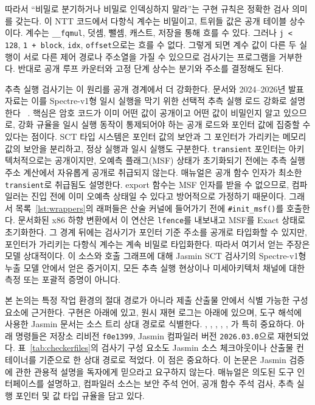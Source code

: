 \documentclass[10pt,twocolumn]{article}
\newcommand{\jasmin}{Jasmin}
\begin{document}
따라서 ``비밀로 분기하거나 비밀로 인덱싱하지 말라''는 구현 규칙은
정확한 검사 의미를 갖는다. 이 NTT 코드에서 다항식 계수는 비밀이고,
트위들 값은 공개 테이블 상수이다. 계수는 \texttt{\_\_fqmul}, 덧셈,
뺄셈, 캐스트, 저장을 통해 흐를 수 있다. 그러나 \texttt{j < 128},
\texttt{1 + block}, \texttt{idx}, \texttt{offset}으로는 흐를 수 없다.
그렇게 되면 계수 값이 다른 두 실행이 서로 다른 제어 경로나 주소열을
가질 수 있으므로 검사기는 프로그램을 거부한다. 반대로 공개 루프
카운터와 고정 단계 상수는 분기와 주소를 결정해도 된다.

추측 실행 검사기는 이 원리를 공개 경계에서 더 강화한다. 문서와
2024--2026년 발표 자료는 이를 Spectre-v1형 일시 실행을 막기 위한
선택적 추측 실행 로드 강화로 설명한다
~\cite{JasminCourse2024,JasminFramework2026}. 핵심은 암호 코드가 이미 어떤 값이 공개이고 어떤 값이 비밀인지
알고 있으므로, 강화 규율을 일시 실행 동작이 통제되어야 하는 공개
로드와 포인터 값에 집중할 수 있다는 점이다. SCT
타입 시스템은 포인터 값의 보안과 그 포인터가 가리키는 메모리 값의
보안을 분리하고, 정상 실행과 일시 실행도 구분한다. \texttt{transient}
포인터는 아키텍처적으로는 공개이지만, 오예측 플래그(MSF) 상태가
초기화되기 전에는 추측 실행 주소 계산에서 자유롭게 공개로 취급되지
않는다. 매뉴얼은 공개 함수 인자가 최소한 \texttt{transient}로 취급됨도
설명한다. export 함수는 MSF 인자를 받을 수 없으므로, 컴파일러는
진입 전에 이미 오예측 상태일 수 있다고 방어적으로 가정하기
때문이다. 그래서 목록~\ref{lst:wrappers}의 래퍼들은 산술 커널에
들어가기 전에 \texttt{\#init\_msf()}를 호출한다. 문서화된 x86 하향
변환에서 이 연산은 \texttt{lfence}를 내보내고 MSF를 Exact 상태로
초기화한다. 그 경계 뒤에는 검사기가 포인터 기준 주소를 공개로
타입화할 수 있지만, 포인터가 가리키는 다항식 계수는 계속 비밀로
타입화한다. 따라서 여기서 얻는 주장은 모델 상대적이다. 이 소스와 호출
그래프에 대해 \jasmin{} SCT 검사기의 Spectre-v1형 누출 모델 안에서
얻은 증거이지, 모든 추측 실행 현상이나 미세아키텍처 채널에 대한 측정
또는 포괄적 증명이 아니다.

본 논의는 특정 작업 환경의 절대 경로가 아니라 제출 산출물 안에서 식별
가능한 구성 요소에 근거한다. 구현은  아래에 있고, 원시
재현 로그는  아래에 있으며, 도구 해석에 사용한
\jasmin{} 문서는 소스 트리 상대 경로로 식별한다.
, ,
, ,
,
가 특히 중요하다. 아래 명령들은
저장소 리비전 \texttt{f0e1399}, \jasmin{} 컴파일러 버전
\texttt{2026.03.0}으로 재현되었다. 표~\ref{tab:checkerfiles}의 검사기
구성 요소도 \jasmin{} 소스 체크아웃이나 산출물 컨테이너를 기준으로 한
상대 경로로 적었다. 이 점은 중요하다. 이 논문은 \jasmin{} 검증에 관한
관용적 설명을 독자에게 믿으라고 요구하지 않는다. 매뉴얼은 의도된 도구
인터페이스를 설명하고, 컴파일러 소스는 보안 주석 언어, 공개 함수 주석
검사, 추측 실행 포인터 및 값 타입 규율을 담고 있다.
\end{document}

